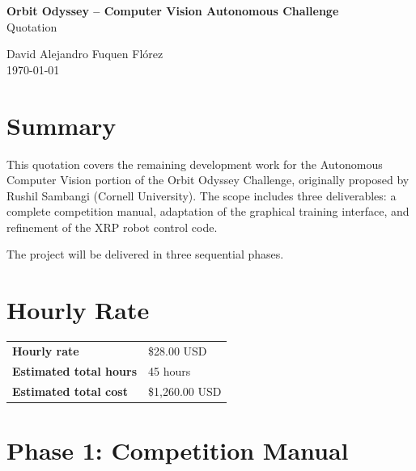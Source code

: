 \documentclass[a4paper]{article}
\begin{document}
\thispagestyle{fancy}

\begin{center}
    \textbf{\large Orbit Odyssey -- Computer Vision Autonomous Challenge} \\[0.3em]
    {\Large Quotation}

    \vspace{1em}

    David Alejandro Fuquen Fl\'orez \\[0.3em]
    {\small \today}
\end{center}

\vspace{1em}

\section*{Summary}

This quotation covers the remaining development work for the Autonomous Computer Vision portion of the Orbit Odyssey Challenge, originally proposed by Rushil Sambangi (Cornell University). The scope includes three deliverables: a complete competition manual, adaptation of the graphical training interface, and refinement of the XRP robot control code.

The project will be delivered in three sequential phases.

\section*{Hourly Rate}

\begin{center}
\begin{tabular}{ll}
\toprule
\textbf{Hourly rate} & \$28.00 USD \\
\textbf{Estimated total hours} & 45 hours \\
\textbf{Estimated total cost} & \$1,260.00 USD \\
\bottomrule
\end{tabular}
\end{center}

\section*{Phase 1: Competition Manual}
\end{document}
